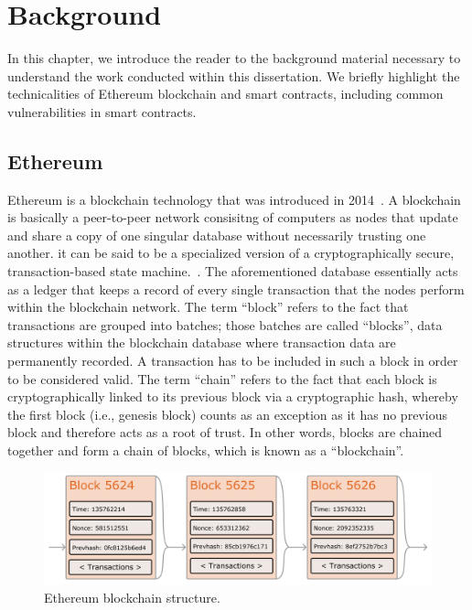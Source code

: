 
\chapter{Background}
\label{chap:background}
    In this chapter, we introduce the reader to the background material necessary to understand the work conducted within this dissertation.
    We briefly highlight the technicalities of Ethereum blockchain and smart contracts, including common vulnerabilities in smart contracts.

\section{Ethereum}
    Ethereum is a blockchain technology that was introduced in 2014~\cite{wood2014ethereum}.
    A blockchain is basically a peer-to-peer network consisitng of computers as nodes that update and share a copy of one singular database without necessarily trusting one another.
    it can be said to be a specialized version of a cryptographically secure, transaction-based state machine.~\cite{wood2014ethereum}.
    The aforementioned database essentially acts as a ledger that keeps a record of every single transaction that the nodes perform within the blockchain network.
    The term “block” refers to the fact that transactions are grouped into batches;
    those batches are called “blocks”, data structures within the blockchain database where transaction data are permanently recorded.
    A transaction has to be included in such a block in order to be considered valid.
    The term “chain” refers to the fact that each block is cryptographically linked to its previous block via a cryptographic hash, whereby the first block (i.e., genesis block) counts as an exception as it has no previous block and therefore acts as a root of trust.
    In other words, blocks are chained together and form a chain of blocks, which is known as a “blockchain”.
    
    \begin{figure}
        \centering
        \includegraphics[width=\textwidth]{figures/ethereum-blocks.png}
        \caption{Ethereum blockchain structure.}
        \label{fig:ethereumBlockchainStructure}
    \end{figure}

